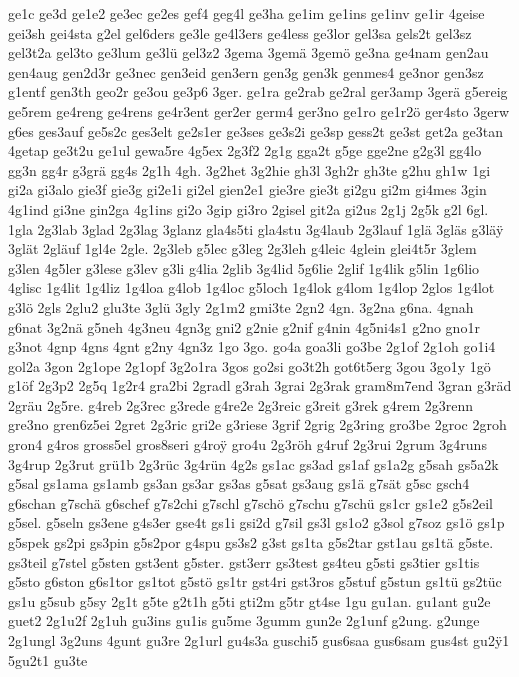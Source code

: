 {ge1c
ge3d
ge1e2
ge3ec
ge2es
gef4
geg4l
ge3ha
ge1im
ge1ins
ge1inv
ge1ir
4geise
gei3sh
gei4sta
g2el
gel6ders
ge3le
ge4l3ers
ge4less
ge3lor
gel3sa
gels2t
gel3sz
gel3t2a
gel3to
ge3lum
ge3lü
gel3z2
3gema
3gemä
3gemö
ge3na
ge4nam
gen2au
gen4aug
gen2d3r
ge3nec
gen3eid
gen3ern
gen3g
gen3k
genmes4
ge3nor
gen3sz
g1entf
gen3th
geo2r
ge3ou
ge3p6
3ger.
ge1ra
ge2rab
ge2ral
ger3amp
3gerä
g5ereig
ge5rem
ge4reng
ge4rens
ge4r3ent
ger2er
germ4
ger3no
ge1ro
ge1r2ö
ger4sto
3gerw
g6es
ges3auf
ge5s2c
ges3elt
ge2s1er
ge3ses
ge3s2i
ge3sp
gess2t
ge3st
get2a
ge3tan
4getap
ge3t2u
ge1ul
gewa5re
4g5ex
2g3f2
2g1g
gga2t
g5ge
gge2ne
g2g3l
gg4lo
gg3n
gg4r
g3grä
gg4s
2g1h
4gh.
3g2het
3g2hie
gh3l
3gh2r
gh3te
g2hu
gh1w
1gi
gi2a
gi3alo
gie3f
gie3g
gi2e1i
gi2el
gien2e1
gie3re
gie3t
gi2gu
gi2m
gi4mes
3gin
4g1ind
gi3ne
gin2ga
4g1ins
gi2o
3gip
gi3ro
2gisel
git2a
gi2us
2g1j
2g5k
g2l
6gl.
1gla
2g3lab
3glad
2g3lag
3glanz
gla4s5ti
gla4stu
3g4laub
2g3lauf
1glä
3gläs
g3lä^^ff
3glät
2gläuf
1gl4e
2gle.
2g3leb
g5lec
g3leg
2g3leh
g4leic
4glein
glei4t5r
3glem
g3len
4g5ler
g3lese
g3lev
g3li
g4lia
2glib
3g4lid
5g6lie
2glif
1g4lik
g5lin
1g6lio
4glisc
1g4lit
1g4liz
1g4loa
g4lob
1g4loc
g5loch
1g4lok
g4lom
1g4lop
2glos
1g4lot
g3lö
2gls
2glu2
glu3te
3glü
3gly
2g1m2
gmi3te
2gn2
4gn.
3g2na
g6na.
4gnah
g6nat
3g2nä
g5neh
4g3neu
4gn3g
gni2
g2nie
g2nif
g4nin
4g5ni4s1
g2no
gno1r
g3not
4gnp
4gns
4gnt
g2ny
4gn3z
1go
3go.
go4a
goa3li
go3be
2g1of
2g1oh
go1i4
gol2a
3gon
2g1ope
2g1opf
3g2o1ra
3gos
go2si
go3t2h
got6t5erg
3gou
3go1y
1gö
g1öf
2g3p2
2g5q
1g2r4
gra2bi
2gradl
g3rah
3grai
2g3rak
gram8m7end
3gran
g3räd
2gräu
2g5re.
g4reb
2g3rec
g3rede
g4re2e
2g3reic
g3reit
g3rek
g4rem
2g3renn
gre3no
gren6z5ei
2gret
2g3ric
gri2e
g3riese
3grif
2grig
2g3ring
gro3be
2groc
2groh
gron4
g4ros
gross5el
gros8seri
g4ro^^ff
gro4u
2g3röh
g4ruf
2g3rui
2grum
3g4runs
3g4rup
2g3rut
grü1b
2g3rüc
3g4rün
4g2s
gs1ac
gs3ad
gs1af
gs1a2g
g5sah
gs5a2k
g5sal
gs1ama
gs1amb
gs3an
gs3ar
gs3as
g5sat
gs3aug
gs1ä
g7sät
g5sc
gsch4
g6schan
g7schä
g6schef
g7s2chi
g7schl
g7schö
g7schu
g7schü
gs1cr
gs1e2
g5s2eil
g5sel.
g5seln
gs3ene
g4s3er
gse4t
gs1i
gsi2d
g7sil
gs3l
gs1o2
g3sol
g7soz
gs1ö
gs1p
g5spek
gs2pi
gs3pin
g5s2por
g4spu
gs3s2
g3st
gs1ta
g5s2tar
gst1au
gs1tä
g5ste.
gs3teil
g7stel
g5sten
gst3ent
g5ster.
gst3err
gs3test
gs4teu
g5sti
gs3tier
gs1tis
g5sto
g6ston
g6s1tor
gs1tot
g5stö
gs1tr
gst4ri
gst3ros
g5stuf
g5stun
gs1tü
gs2tüc
gs1u
g5sub
g5sy
2g1t
g5te
g2t1h
g5ti
gti2m
g5tr
gt4se
1gu
gu1an.
gu1ant
gu2e
guet2
2g1u2f
2g1uh
gu3ins
gu1is
gu5me
3gumm
gun2e
2g1unf
g2ung.
g2unge
2g1ungl
3g2uns
4gunt
gu3re
2g1url
gu4s3a
guschi5
gus6saa
gus6sam
gus4st
gu2^^ff1
5gu2t1
gu3te
}
